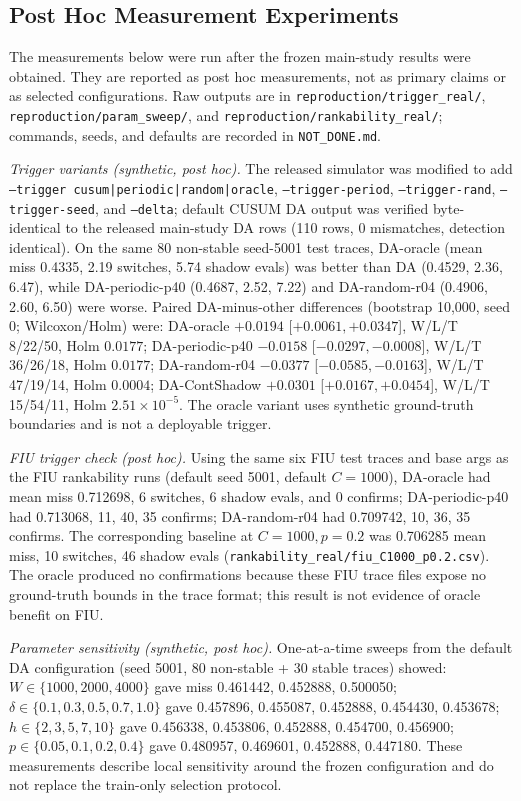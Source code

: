 \documentclass[10pt,twocolumn,a4paper]{IEEEtran}
\begin{document}
\subsection{Post Hoc Measurement Experiments}
\label{sec:posthoc}
The measurements below were run after the frozen main-study results were
obtained. They are reported as post hoc measurements, not as primary
claims or as selected configurations. Raw outputs are in
\texttt{reproduction/trigger\_real/}, \texttt{reproduction/param\_sweep/},
and \texttt{reproduction/rankability\_real/}; commands, seeds, and defaults
are recorded in \texttt{NOT\_DONE.md}.

\emph{Trigger variants (synthetic, post hoc).} The released simulator was
modified to add \texttt{--trigger cusum|periodic|random|oracle},
\texttt{--trigger-period}, \texttt{--trigger-rand}, \texttt{--trigger-seed},
and \texttt{--delta}; default CUSUM DA output was verified byte-identical to
the released main-study DA rows (110 rows, 0 mismatches, detection
identical). On the same 80 non-stable seed-5001 test traces, DA-oracle
(mean miss 0.4335, 2.19 switches, 5.74 shadow evals) was better than DA
(0.4529, 2.36, 6.47), while DA-periodic-p40 (0.4687, 2.52, 7.22) and
DA-random-r04 (0.4906, 2.60, 6.50) were worse. Paired DA-minus-other
differences (bootstrap 10,000, seed 0; Wilcoxon/Holm) were: DA-oracle
$+0.0194$ [$+0.0061,+0.0347$], W/L/T 8/22/50, Holm $0.0177$; DA-periodic-p40
$-0.0158$ [$-0.0297,-0.0008$], W/L/T 36/26/18, Holm $0.0177$; DA-random-r04
$-0.0377$ [$-0.0585,-0.0163$], W/L/T 47/19/14, Holm $0.0004$; DA-ContShadow
$+0.0301$ [$+0.0167,+0.0454$], W/L/T 15/54/11, Holm $2.51{\times}10^{-5}$.
The oracle variant uses synthetic ground-truth boundaries and is not a
deployable trigger.

\emph{FIU trigger check (post hoc).} Using the same six FIU test traces and
base args as the FIU rankability runs (default seed 5001, default $C=1000$),
DA-oracle had mean miss 0.712698, 6 switches, 6 shadow evals, and 0 confirms;
DA-periodic-p40 had 0.713068, 11, 40, 35 confirms; DA-random-r04 had
0.709742, 10, 36, 35 confirms. The corresponding baseline at $C=1000, p=0.2$
was 0.706285 mean miss, 10 switches, 46 shadow evals
(\texttt{rankability\_real/fiu\_C1000\_p0.2.csv}). The oracle produced no
confirmations because these FIU trace files expose no ground-truth bounds in
the trace format; this result is not evidence of oracle benefit on FIU.

\emph{Parameter sensitivity (synthetic, post hoc).} One-at-a-time sweeps from
the default DA configuration (seed 5001, 80 non-stable + 30 stable traces)
showed: $W\in\{1000,2000,4000\}$ gave miss 0.461442, 0.452888, 0.500050;
$\delta\in\{0.1,0.3,0.5,0.7,1.0\}$ gave 0.457896, 0.455087, 0.452888,
0.454430, 0.453678; $h\in\{2,3,5,7,10\}$ gave 0.456338, 0.453806, 0.452888,
0.454700, 0.456900; $p\in\{0.05,0.1,0.2,0.4\}$ gave 0.480957, 0.469601,
0.452888, 0.447180. These measurements describe local sensitivity around the
frozen configuration and do not replace the train-only selection protocol.
\end{document}
